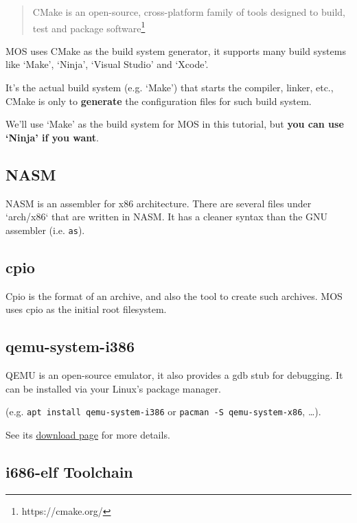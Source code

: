 \begin{quote}
    CMake is an open-source, cross-platform family of tools designed to build, test and package
    software\footnote{https://cmake.org/}
\end{quote}

MOS uses CMake as the build system generator, it supports many build systems like `Make', `Ninja',
`Visual Studio' and `Xcode'.

\begin{note}
    \item It's the actual build system (e.g. `Make') that starts the compiler, linker, etc.,
    CMake is only to \textbf{generate} the configuration files for such build system.
\end{note}

We'll use `Make' as the build system for MOS in this tutorial, but
\textbf{you can use `Ninja' if you want}.

\subsection{NASM} \label{sec:nasm}

NASM is an assembler for x86 architecture. There are several files under `arch/x86`
that are written in NASM. It has a cleaner syntax than the GNU assembler (i.e. \texttt{as}).

\subsection{cpio} \label{sec:cpio}

Cpio is the format of an archive, and also the tool to create such archives. MOS uses cpio as
the initial root filesystem.

\subsection{qemu-system-i386} \label{sec:qemu}

QEMU is an open-source emulator, it also provides a gdb stub for debugging. It can be
installed via your Linux's package manager.

(e.g. \texttt{apt install qemu-system-i386} or \texttt{pacman -S qemu-system-x86}, \dots).

See its \href{https://www.qemu.org/download}{download page} for more details.

\subsection{i686-elf Toolchain} \label{sec:cross-compiler}

